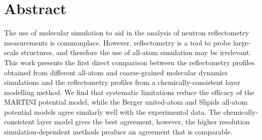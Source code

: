 \section*{Abstract}
The use of molecular simulation to aid in the analysis of neutron reflectometry measurements is commonplace.
However, reflectometry is a tool to probe large-scale structures, and therefore the use of all-atom simulation may be irrelevant.
This work presents the first direct comparison between the reflectometry profiles obtained from different all-atom and coarse-grained molecular dynamics simulations and the reflectometry profiles from a chemically-consistent layer modelling method.
We find that systematic limitations reduce the efficacy of the MARTINI potential model, while the Berger united-atom and Slipids all-atom potential models agree similarly well with the experimental data.
The chemically-consistent layer model gives the best agreement, however, the higher resolution simulation-dependent methods produce an agreement that is comparable.
